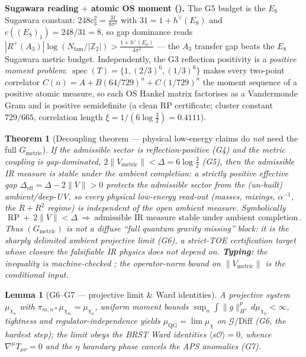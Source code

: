\documentclass[11pt,a4paper]{article}
\newcommand{\cthree}{c_3}
\newcommand{\Nfam}{N_{\mathrm{fam}}}
\newcommand{\Z}{\mathbb Z}
\newtheorem{lemma}{Lemma}
\newtheorem{theorem}{Theorem}
\begin{document}
\par\smallskip\noindent\textbf{Sugawara reading $+$ atomic OS moment ().}
The G5 budget is the $E_8$ Sugawara constant: $248\cthree^2=\tfrac{31}{8\pi^2}$ with $31=1+h^\vee(E_8)$ and
$c((E_8)_1)=248/31=8$, so gap dominance reads
$|R^+(A_3)|\log(\Nfam/|\Z_2|)>\tfrac{1+h^\vee(E_8)}{4\pi^2}$ --- the $A_3$ transfer gap beats the $E_8$
Sugawara metric budget. Independently, the G3 reflection positivity is a \emph{positive moment problem}:
$\operatorname{spec}(T)=\{1,(2/3)^6,(1/3)^6\}$ makes every two-point correlator
$C(n)=A+B(64/729)^n+C(1/729)^n$ the moment sequence of a positive atomic measure, so each OS Hankel matrix
factorises as a Vandermonde Gram and is positive semidefinite (a clean RP certificate; cluster constant
$729/665$, correlation length $\xi=1/(6\log\tfrac32)=0.4111$).

\begin{theorem}[Decoupling theorem --- physical low-energy claims do \emph{not} need the full $G_{\mathrm{metric}}$]
\emph{If} the admissible sector is reflection-positive (G4) and the metric coupling is gap-dominated,
$2\|V_{\mathrm{metric}}\|<\Delta=6\log\tfrac32$ (G5), \emph{then} the admissible IR measure is stable under
the ambient completion: a strictly positive effective gap $\Delta_{\mathrm{eff}}=\Delta-2\|V\|>0$ protects the
admissible sector from the (un-built) ambient/deep-UV, so every \emph{physical low-energy} read-out (masses,
mixings, $\alpha^{-1}$, the $R{+}R^2$ regime) is independent of the open ambient measure. Symbolically
\[
  \boxed{\ \mathrm{RP}\ +\ 2\|V\|<\Delta\ \Longrightarrow\ \text{admissible IR measure stable under ambient completion}\ .}
\]
Thus $(G_{\mathrm{metric}})$ is \emph{not} a diffuse ``full quantum gravity missing'' block: it is the sharply
delimited \emph{ambient projective limit} (G6), a strict-TOE certification target whose closure the
falsifiable IR physics does not depend on. \textbf{Typing:} the inequality is machine-checked \mE; the
operator-norm bound on $\|V_{\mathrm{metric}}\|$ is the conditional input.
\end{theorem}

\begin{lemma}[G6--G7 --- projective limit \& Ward identities]
A projective system $\mu_{\chi_n}$ with $\pi_{m,n*}\mu_{\chi_m}=\mu_{\chi_n}$, uniform moment bounds
$\sup_n\!\int\|g\|_{H^s}^p\,d\mu_{\chi_n}<\infty$, tightness and regulator-independence yields
$\mu_{\mathrm{QG}}=\lim\mu_\chi$ on $\mathcal G/\mathrm{Diff}$ (G6, the hardest step); the limit obeys the
BRST Ward identities $\langle s\mathcal O\rangle=0$, whence $\nabla^\mu T_{\mu\nu}=0$ and the $\eta$
boundary phase cancels the APS anomalies (G7).
\end{lemma}
\end{document}

